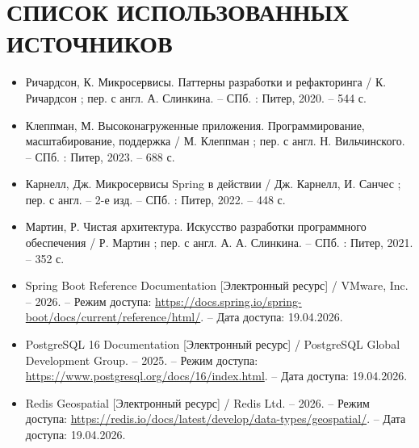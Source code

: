 \sectionbreak \section*{ 
	\gostTitleFont
	\redline
	СПИСОК ИСПОЛЬЗОВАННЫХ ИСТОЧНИКОВ
}
\titlespace

{\sloppy \gostFont
	
	\begin{itemize}[leftmargin=2.15cm, labelwidth=0.65cm, labelsep=0.0cm] 
		
		\item[\theimagecntr.] Ричардсон, К. Микросервисы. Паттерны разработки и рефакторинга / К. Ричардсон ; пер. с англ. А. Слинкина. – СПб. : Питер, 2020. – 544 с.
		\addtocounter{imagecntr}{1}
		
		\item[\theimagecntr.] Клеппман, М. Высоконагруженные приложения. Программирование, масштабирование, поддержка / М. Клеппман ; пер. с англ. Н. Вильчинского. – СПб. : Питер, 2023. – 688 с.
		\addtocounter{imagecntr}{1}
		
		\item[\theimagecntr.] Карнелл, Дж. Микросервисы Spring в действии / Дж. Карнелл, И. Санчес ; пер. с англ. – 2-е изд. – СПб. : Питер, 2022. – 448 с.
		\addtocounter{imagecntr}{1}
		
		\item[\theimagecntr.] Мартин, Р. Чистая архитектура. Искусство разработки программного обеспечения / Р. Мартин ; пер. с англ. А. А. Слинкина. – СПб. : Питер, 2021. – 352 с. 
		\addtocounter{imagecntr}{1}
		
		\item[\theimagecntr.] Spring Boot Reference Documentation [Электронный ресурс] / VMware, Inc. – 2026. – Режим доступа: \url{https://docs.spring.io/spring-boot/docs/current/reference/html/}. – Дата доступа: 19.04.2026.
		\addtocounter{imagecntr}{1}
		
		\item[\theimagecntr.] PostgreSQL 16 Documentation [Электронный ресурс] / PostgreSQL Global Development Group. – 2025. – Режим доступа: \url{https://www.postgresql.org/docs/16/index.html}. – Дата доступа: 19.04.2026.
		\addtocounter{imagecntr}{1}
		
		\item[\theimagecntr.] Redis Geospatial [Электронный ресурс] / Redis Ltd. – 2026. – Режим доступа: \url{https://redis.io/docs/latest/develop/data-types/geospatial/}. – Дата доступа: 19.04.2026.
		\addtocounter{imagecntr}{1}
		

\end{itemize}}

